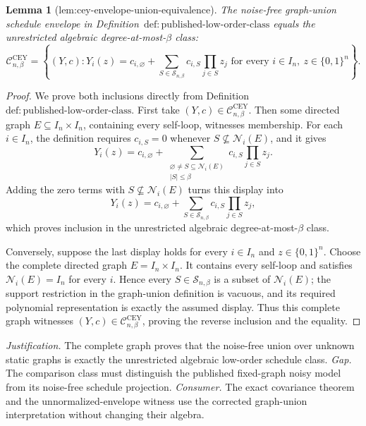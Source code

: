 \documentclass{article}
\newtheorem{lemma}{Lemma}
\begin{document}
\begin{lemma}[lem:cey-envelope-union-equivalence]\label{lem:cey-envelope-union-equivalence}
The noise-free graph-union schedule envelope in Definition~\(\mathrm{def{:}published\text{-}low\text{-}order\text{-}class}\) equals the unrestricted algebraic degree-at-most-\(\beta\) class:
\[
\mathcal C^{\mathrm{CEY}}_{n,\beta}
=\left\{(Y,c):Y_i(z)=c_{i,\varnothing}+
\sum_{S\in\mathcal S_{n,\beta}}c_{i,S}\prod_{j\in S}z_j
\text{ for every }i\in I_n,\ z\in\{0,1\}^n\right\}.
\]
\end{lemma}
\begin{proof}
We prove both inclusions directly from Definition~\(\mathrm{def{:}published\text{-}low\text{-}order\text{-}class}\).  First take \((Y,c)\in\mathcal C^{\mathrm{CEY}}_{n,\beta}\).  Then some directed graph \(E\subseteq I_n\times I_n\), containing every self-loop, witnesses membership.  For each \(i\in I_n\), the definition requires \(c_{i,S}=0\) whenever \(S\nsubseteq\mathcal N_i(E)\), and it gives
\[
Y_i(z)=c_{i,\varnothing}
+\sum_{\substack{\varnothing\ne S\subseteq\mathcal N_i(E)\\|S|\le\beta}}
c_{i,S}\prod_{j\in S}z_j.
\]
Adding the zero terms with \(S\nsubseteq\mathcal N_i(E)\) turns this display into
\[
Y_i(z)=c_{i,\varnothing}
+\sum_{S\in\mathcal S_{n,\beta}}c_{i,S}\prod_{j\in S}z_j,
\]
which proves inclusion in the unrestricted algebraic degree-at-most-\(\beta\) class.

Conversely, suppose the last display holds for every \(i\in I_n\) and \(z\in\{0,1\}^n\).  Choose the complete directed graph \(E=I_n\times I_n\).  It contains every self-loop and satisfies \(\mathcal N_i(E)=I_n\) for every \(i\).  Hence every \(S\in\mathcal S_{n,\beta}\) is a subset of \(\mathcal N_i(E)\); the support restriction in the graph-union definition is vacuous, and its required polynomial representation is exactly the assumed display.  Thus this complete graph witnesses \((Y,c)\in\mathcal C^{\mathrm{CEY}}_{n,\beta}\), proving the reverse inclusion and the equality.
\end{proof}
\par\smallskip\noindent \textit{Justification.} The complete graph proves that the noise-free union over unknown static graphs is exactly the unrestricted algebraic low-order schedule class. \textit{Gap.} The comparison class must distinguish the published fixed-graph noisy model from its noise-free schedule projection. \textit{Consumer.} The exact covariance theorem and the unnormalized-envelope witness use the corrected graph-union interpretation without changing their algebra.
\end{document}
